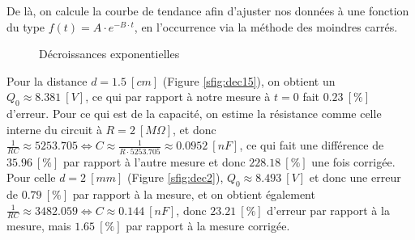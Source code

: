 \documentclass[11pt]{article}
\begin{document}
De là, on calcule la courbe de tendance afin d'ajuster nos données à une fonction du type $f(t) = A \cdot e^{-B \cdot t}$, en l’occurrence via la méthode des moindres carrés.

\begin{figure}[H]
\centering
{}\hfill 
{}\hfill 
\caption{Décroissances exponentielles}
\label{fig:decgeo}
\end{figure}

Pour la distance $d=1.5 \  [cm]$ (Figure \ref{sfig:dec15}), on obtient un $Q_0 \approx 8.381 \ [V]$, ce qui par rapport à notre mesure à $t=0$ fait $0.23 \ [\%]$ d'erreur. Pour ce qui est de la capacité, on estime la résistance comme celle interne du circuit à $R=2 \ [M \Omega]$, et donc $\frac{1}{RC} \approx 5253.705 \Leftrightarrow C \approx \frac{1}{R \cdot 5253.705} \approx 0.0952 \ [nF]$, ce qui fait une différence de $35.96 \ [\%]$ par rapport à l'autre mesure et donc $228.18 \ [\%]$ une fois corrigée.\\
Pour celle $d=2 \  [mm]$ (Figure \ref{sfig:dec2}), $Q_0 \approx 8.493 \ [V]$ et donc une erreur de $0.79 \ [\%]$ par rapport à la mesure, et on obtient également $\frac{1}{RC} \approx 3482.059 \Leftrightarrow C \approx 0.144 \ [nF]$, donc $23.21 \ [\%]$ d'erreur par rapport à la mesure, mais $1.65 \ [\%]$ par rapport à la mesure corrigée.
\end{document}
